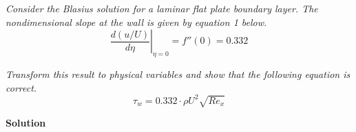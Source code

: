 \section{}


\textit{Consider the Blasius solution for a laminar flat plate boundary layer. The nondimensional slope at the wall is given by equation 1 below.}
\begin{equation}
    \left. \frac{d(u/U)}{d\eta} \right|_{\eta=0} = f''(0) = 0.332 \label{eq:1}
\end{equation}

\textit{Transform this result to physical variables and show that the following equation is correct.}
\begin{equation}
    \tau_w = 0.332 \cdot \rho U^2 \sqrt{Re_x} \label{eq:2}
\end{equation}

\textbf{Solution}

